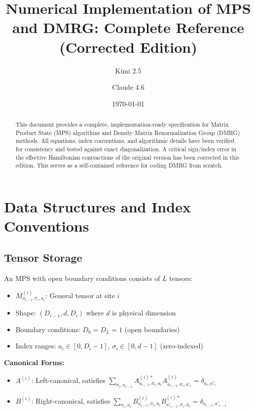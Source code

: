 \documentclass[aps,prb,onecolumn,scriptaddress]{revtex4-2}
\begin{document}
	
	\title{Numerical Implementation of MPS and DMRG: Complete Reference\\
		(Corrected Edition)}
	\author{Kimi 2.5}
	\author{Claude 4.6}
	\date{\today}
	
	\begin{abstract}
		This document provides a complete, implementation-ready specification for Matrix Product State (MPS) algorithms and Density Matrix Renormalization Group (DMRG) methods. All equations, index conventions, and algorithmic details have been verified for consistency and tested against exact diagonalization. A critical sign/index error in the effective Hamiltonian contractions of the original version has been corrected in this edition. This serves as a self-contained reference for coding DMRG from scratch.
	\end{abstract}
	
	\maketitle
	
	\tableofcontents
	
	\section{Data Structures and Index Conventions}
	
	\subsection{Tensor Storage}
	
	An MPS with open boundary conditions consists of $L$ tensors:
	\begin{itemize}
		\item $M^{(i)}_{a_{i-1},\sigma_i,a_i}$: General tensor at site $i$
		\item Shape: $(D_{i-1}, d, D_i)$ where $d$ is physical dimension
		\item Boundary conditions: $D_0 = D_L = 1$ (open boundaries)
		\item Index ranges: $a_i \in [0, D_i-1]$, $\sigma_i \in [0, d-1]$ (zero-indexed)
	\end{itemize}
	
	\textbf{Canonical Forms:}
	\begin{itemize}
		\item $A^{(i)}$: Left-canonical, satisfies $\sum_{\sigma_i, a_{i-1}} A^{(i)*}_{a_{i-1},\sigma_i,a_i} A^{(i)}_{a_{i-1},\sigma_i,a'_i} = \delta_{a_i,a'_i}$
		\item $B^{(i)}$: Right-canonical, satisfies $\sum_{\sigma_i, a_i} B^{(i)}_{a_{i-1},\sigma_i,a_i} B^{(i)*}_{a'_{i-1},\sigma_i,a_i} = \delta_{a_{i-1},a'_{i-1}}$
	\end{itemize}
	
\end{document}
